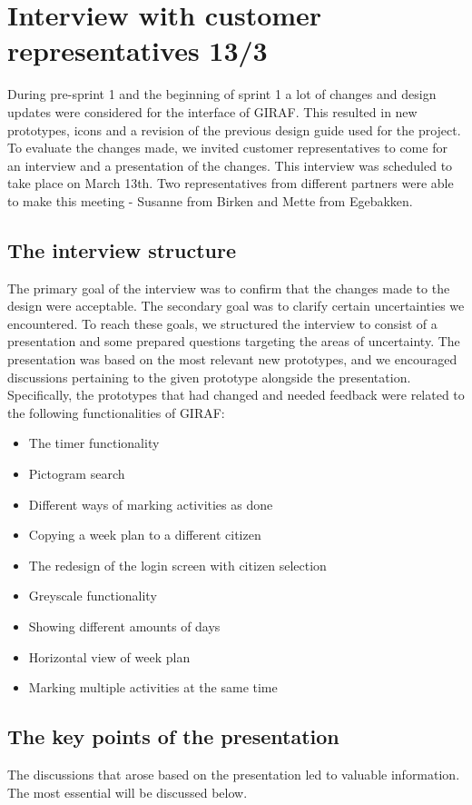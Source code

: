 \section{Interview with customer representatives 13/3}\label{interview13-3}
During pre-sprint 1 and the beginning of sprint 1 a lot of changes and design updates were considered for the interface of GIRAF.
This resulted in new prototypes, icons and a revision of the previous design guide used for the project.
To evaluate the changes made, we invited customer representatives to come for an interview and a presentation of the changes.
This interview was scheduled to take place on March 13th.
Two representatives from different partners were able to make this meeting - Susanne from Birken and Mette from Egebakken.

\subsection{The interview structure}
The primary goal of the interview was to confirm that the changes made to the design were acceptable.
The secondary goal was to clarify certain uncertainties we encountered.
To reach these goals, we structured the interview to consist of a presentation and some prepared questions targeting the areas of uncertainty.
The presentation was based on the most relevant new prototypes, and we encouraged discussions pertaining to the given prototype alongside the presentation.
Specifically, the prototypes that had changed and needed feedback were related to the following functionalities of GIRAF:
\begin{itemize}
    \item The timer functionality
    \item Pictogram search
    \item Different ways of marking activities as done
    \item Copying a week plan to a different citizen
    \item The redesign of the login screen with citizen selection
    \item Greyscale functionality
    \item Showing different amounts of days
    \item Horizontal view of week plan
    \item Marking multiple activities at the same time
\end{itemize}

\subsection{The key points of the presentation}
The discussions that arose based on the presentation led to valuable information.
The most essential will be discussed below.

